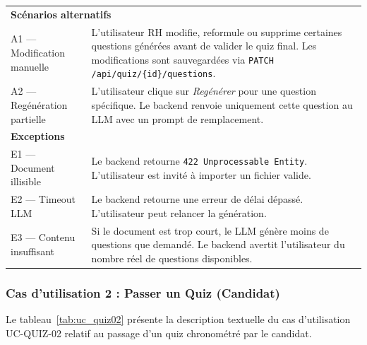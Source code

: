 \begin{longtable}{|p{4cm}|p{10cm}|}
{} \\ \hline
\multicolumn{2}{|l|}{\textbf{Scénarios alternatifs}} \\ \hline
A1 — Modification manuelle &
L'utilisateur RH modifie, reformule ou supprime certaines questions générées avant de valider le quiz final. Les modifications sont sauvegardées via \texttt{PATCH /api/quiz/\{id\}/questions}. \\ \hline
A2 — Regénération partielle &
L'utilisateur clique sur \textit{Regénérer} pour une question spécifique. Le backend renvoie uniquement cette question au LLM avec un prompt de remplacement. \\ \hline
\multicolumn{2}{|l|}{\textbf{Exceptions}} \\ \hline
E1 — Document illisible & Le backend retourne \texttt{422 Unprocessable Entity}. L'utilisateur est invité à importer un fichier valide. \\ \hline
E2 — Timeout LLM & Le backend retourne une erreur de délai dépassé. L'utilisateur peut relancer la génération. \\ \hline
E3 — Contenu insuffisant & Si le document est trop court, le LLM génère moins de questions que demandé. Le backend avertit l'utilisateur du nombre réel de questions disponibles. \\ \hline
\end{longtable}
\renewcommand{\arraystretch}{1}

\subsubsection{Cas d'utilisation 2 : Passer un Quiz (Candidat)}

Le tableau~\ref{tab:uc_quiz02} présente la description textuelle du cas d'utilisation UC-QUIZ-02 relatif au passage d'un quiz chronométré par le candidat.

